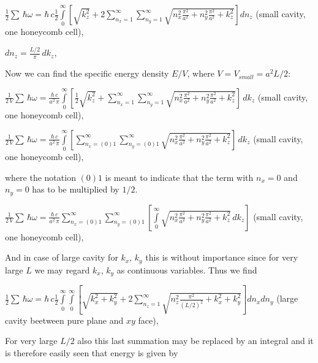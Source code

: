 \documentclass[11pt]{article}
\begin{document}
    \(\frac{1}{2}\sum\,\hbar\omega = \hbar\,c\frac{1}{2}\int\limits_{0}^{\infty}\left[{\sqrt{k_z^2}+2\sum\limits_{n_x=1}^{\infty}\sum\limits_{n_y=1}^{\infty}\sqrt{n_x^2\frac{\pi^2}{a^2}+n_y^2\frac{\pi^2}{a^2}+k_z^2}}\right]d{n_z}\)
(small cavity, one honeycomb cell),

    \(dn_z = \frac{L/2}{\pi}\,dk_z\),

    Now we can find the specific energy density \(E/V\), where
\(V = V_{small} = a^2 L/2\):


    \(\frac{1}{2\,V}\sum\,\hbar\omega = \frac{\hbar\,c}{a^2\,\pi}\int\limits_{0}^{\infty}\left[{\frac{1}{2}\sqrt{k_z^2}+\sum\limits_{n_x=1}^{\infty}\sum\limits_{n_y=1}^{\infty}\sqrt{n_x^2\frac{\pi^2}{a^2}+n_y^2\frac{\pi^2}{a^2}+k_z^2}}\right]\,dk_z\)
(small cavity, one honeycomb cell),

    \(\frac{1}{2\,V}\sum\,\hbar\omega = \frac{\hbar\,c}{a^2\,\pi}\int\limits_{0}^{\infty}\left[{\sum\limits_{n_x=(0)1}^{\infty}\sum\limits_{n_y=(0)1}^{\infty}\sqrt{n_x^2\frac{\pi^2}{a^2}+n_y^2\frac{\pi^2}{a^2}+k_z^2}}\right]\,dk_z\)
(small cavity, one honeycomb cell),

    where the notation \(\left(0\right) 1\) is meant to indicate that the
term with \(n_x = 0\) and \(n_y = 0\) has to be multiplied by
\(1\big/2\).

    \(\frac{1}{2\,V}\sum\,\hbar\omega = \frac{\hbar\,c}{a^2\,\pi}\sum\limits_{n_x=(0)1}^{\infty}\sum\limits_{n_y=(0)1}^{\infty}\left[\int\limits_{0}^{\infty}\sqrt{n_x^2\frac{\pi^2}{a^2}+n_y^2\frac{\pi^2}{a^2}+k_z^2}\,dk_z\right]\)
(small cavity, one honeycomb cell),

    And in case of large cavity for \(k_x\), \(k_y\) this is without
importance since for very large \(L\) we may regard \(k_x\), \(k_y\) as
continuous variables. Thus we find

    \(\frac{1}{2}\sum\,\hbar\omega = \hbar\,c\frac{1}{2}\int\limits_{0}^{\infty}\int\limits_{0}^{\infty}\left[{\sqrt{k_x^2+k_y^2}+2\sum\limits_{n_z=1}^{\infty}\sqrt{n_z^2\frac{\pi^2}{(L/2)^2}+k_x^2+k_y^2}}\right]d{n_x}d{n_y}\)
(large cavity beetween pure plane and \(xy\) face),

    For very large \(L/2\) also this last summation may be replaced by an
integral and it is therefore easily seen that energy is given by
\end{document}
